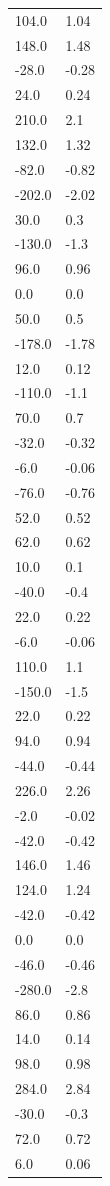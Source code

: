 \begin{longtable}{ll}
104.0 & 1.04 \\
148.0 & 1.48 \\
-28.0 & -0.28 \\
24.0 & 0.24 \\
210.0 & 2.1 \\
132.0 & 1.32 \\
-82.0 & -0.82 \\
-202.0 & -2.02 \\
30.0 & 0.3 \\
-130.0 & -1.3 \\
96.0 & 0.96 \\
0.0 & 0.0 \\
50.0 & 0.5 \\
-178.0 & -1.78 \\
12.0 & 0.12 \\
-110.0 & -1.1 \\
70.0 & 0.7 \\
-32.0 & -0.32 \\
-6.0 & -0.06 \\
-76.0 & -0.76 \\
52.0 & 0.52 \\
62.0 & 0.62 \\
10.0 & 0.1 \\
-40.0 & -0.4 \\
22.0 & 0.22 \\
-6.0 & -0.06 \\
110.0 & 1.1 \\
-150.0 & -1.5 \\
22.0 & 0.22 \\
94.0 & 0.94 \\
-44.0 & -0.44 \\
226.0 & 2.26 \\
-2.0 & -0.02 \\
-42.0 & -0.42 \\
146.0 & 1.46 \\
124.0 & 1.24 \\
-42.0 & -0.42 \\
0.0 & 0.0 \\
-46.0 & -0.46 \\
-280.0 & -2.8 \\
86.0 & 0.86 \\
14.0 & 0.14 \\
98.0 & 0.98 \\
284.0 & 2.84 \\
-30.0 & -0.3 \\
72.0 & 0.72 \\
6.0 & 0.06 \\

\end{longtable}
